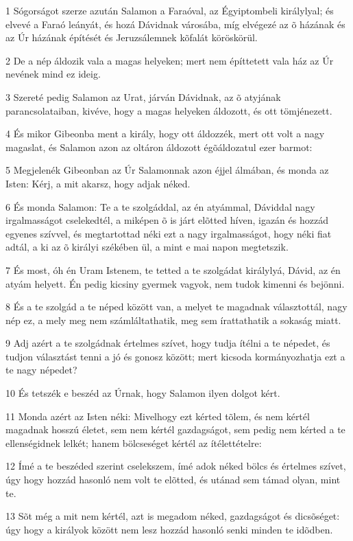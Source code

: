 \par 1 Sógorságot szerze azután Salamon a Faraóval, az Égyiptombeli királylyal; és elvevé a Faraó leányát, és hozá Dávidnak városába, míg elvégezé az õ  házának és az Úr házának építését és Jeruzsálemnek kõfalát köröskörül.
\par 2 De a nép áldozik vala a magas helyeken; mert nem építtetett vala ház az Úr nevének mind ez ideig.
\par 3 Szereté pedig Salamon az Urat, járván Dávidnak, az õ atyjának parancsolataiban, kivéve, hogy a magas helyeken  áldozott, és ott tömjénezett.
\par 4 És mikor Gibeonba ment a király, hogy ott áldozzék, mert ott volt a nagy magaslat, és Salamon azon az oltáron áldozott égõáldozatul ezer barmot:
\par 5 Megjelenék Gibeonban az Úr Salamonnak azon éjjel álmában, és monda az Isten: Kérj, a mit akarsz, hogy adjak néked.
\par 6 És monda Salamon: Te a te szolgáddal, az én atyámmal, Dáviddal nagy irgalmasságot cselekedtél, a miképen õ is járt elõtted híven, igazán és hozzád egyenes szívvel, és megtartottad néki ezt a nagy irgalmasságot, hogy néki fiat adtál, a ki az õ királyi székében ül, a mint e mai napon megtetszik.
\par 7 És most, óh én Uram Istenem, te tetted a te szolgádat királylyá, Dávid, az én atyám helyett. Én pedig kicsiny gyermek vagyok, nem tudok kimenni és bejönni.
\par 8 És a te szolgád a te néped között van, a melyet te magadnak választottál, nagy nép ez, a mely meg nem számláltathatik, meg sem írattathatik a sokaság miatt.
\par 9 Adj azért a te szolgádnak értelmes szívet, hogy tudja ítélni a te népedet, és tudjon választást tenni a jó és gonosz között; mert kicsoda kormányozhatja ezt a te nagy népedet?
\par 10 És tetszék e beszéd az Úrnak, hogy Salamon ilyen dolgot kért.
\par 11 Monda azért az Isten néki: Mivelhogy ezt kérted tõlem, és nem kértél magadnak hosszú életet, sem nem kértél gazdagságot, sem pedig nem kérted a te ellenségidnek lelkét; hanem bölcseséget kértél az ítélettételre:
\par 12 Ímé a te beszéded szerint cselekszem, ímé adok néked bölcs és értelmes szívet, úgy hogy hozzád hasonló nem volt te elõtted, és utánad sem támad olyan, mint te.
\par 13 Sõt még a mit nem kértél, azt is megadom néked, gazdagságot és dicsõséget: úgy hogy a királyok között nem lesz hozzád hasonló senki minden te idõdben.
